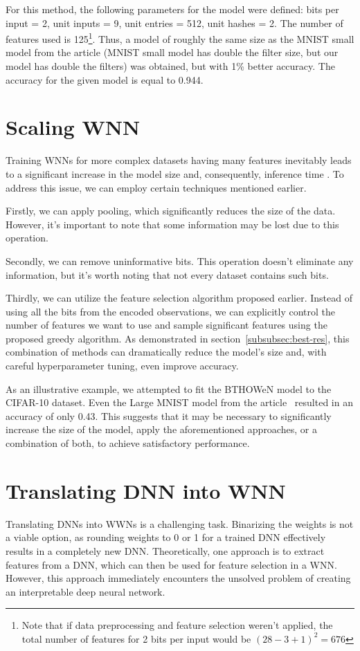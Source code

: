 \documentclass{article}[12pt]
\begin{document}
For this method, the following parameters for the model were defined: bits per input = 2, unit inputs = 9, unit entries = 512, unit hashes = 2.
The number of features used is 125\footnote{Note that if data preprocessing and feature selection weren't applied, the total number of features for 2 bits per input would be $(28-3+1)^2 = 676$}.
Thus, a model of roughly the same size as the MNIST small model from the article \cite{susskind2022weightless} (MNIST small model has double the filter size, but our model has double the filters) was obtained, but with 1\% better accuracy.
The accuracy for the given model is equal to 0.944.


\section{Scaling WNN}\label{sec:scaling-wnn}
Training WNNs for more complex datasets having many features inevitably leads to a significant increase in the model size and, consequently, inference time \cite{aleksander2009brief}.
To address this issue, we can employ certain techniques mentioned earlier.

Firstly, we can apply pooling, which significantly reduces the size of the data.
However, it's important to note that some information may be lost due to this operation.

Secondly, we can remove uninformative bits.
This operation doesn't eliminate any information, but it's worth noting that not every dataset contains such bits.

Thirdly, we can utilize the feature selection algorithm proposed earlier.
Instead of using all the bits from the encoded observations, we can explicitly control the number of features we want to use and sample significant features using the proposed greedy algorithm.
As demonstrated in section~\ref{subsubsec:best-res}, this combination of methods can dramatically reduce the model's size and, with careful hyperparameter tuning, even improve accuracy.

As an illustrative example, we attempted to fit the BTHOWeN model to the CIFAR-10 dataset.
Even the Large MNIST model from the article~\cite{susskind2022weightless} resulted in an accuracy of only 0.43.
This suggests that it may be necessary to significantly increase the size of the model, apply the aforementioned approaches, or a combination of both, to achieve satisfactory performance.

\section{Translating DNN into WNN}\label{sec:translating-dnn-into-wnn}
Translating DNNs into WWNs is a challenging task.
Binarizing the weights is not a viable option, as rounding weights to 0 or 1 for a trained DNN effectively results in a completely new DNN\@.
Theoretically, one approach is to extract features from a DNN, which can then be used for feature selection in a WNN\@.
However, this approach immediately encounters the unsolved problem of creating an interpretable deep neural network.
\end{document}
